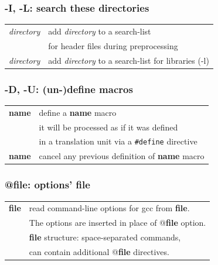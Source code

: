 \documentclass[aspectratio=169]{beamer}
\begin{document}
\begin{frame}
\frametitle{-I, -L: search these directories}
\begin{table}
\begin{tabular}{l l}
\toprule
\texttt{\color{clFlag}{-I}}\textit{directory} &
    add \textit{directory} to a search-list \\[1ex]
    & for header files during preprocessing \\[2ex]
\texttt{\color{clFlag}{-L}}\textit{directory} &
    add \textit{directory} to a search-list for libraries (-l)\\ [3ex]
\bottomrule
\end{tabular}
\end{table}
\end{frame}


\begin{frame}
\frametitle{-D, -U: (un-)define macros}
\begin{table}
\begin{tabular}{l l}
\toprule
\texttt{\color{clFlag}{-D}}\textbf{name} &
    define a \textbf{name} macro\\[1ex]
    & it will be processed as if it was defined\\[1ex]
    & in a translation unit via a \texttt{\#define} directive\\[1ex]
\texttt{\color{clFlag}{-U}}\textbf{name} &
    cancel any previous definition of \textbf{name} macro\\[3ex]
\bottomrule
\end{tabular}
\end{table}
\end{frame}


\begin{frame}
\frametitle{@file: options' file}

\begin{table}
\begin{tabular}{l l}
\toprule
\texttt{\color{clFlag}{@}}\textbf{file} &
    read command-line options for gcc from \textbf{file}.\\[1ex]
    & The options are inserted in place of @\textbf{file} option.\\[1ex]
    & \textbf{file} structure: space-separated commands,\\[1ex]
    & can contain additional @\textbf{file} directives. \\[1ex]
\bottomrule
\end{tabular}
\end{table}
\end{frame}
\end{document}
